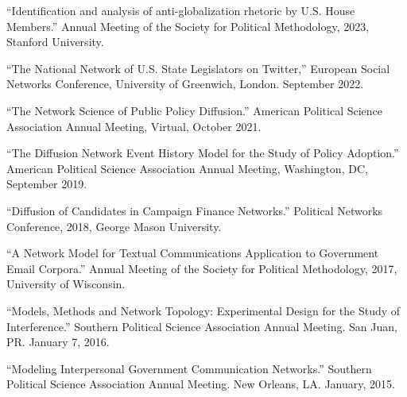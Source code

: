 \documentclass[overlapped,line]{res}
\begin{document}
\begin{resume}
\begin{etaremune}
\item ``Identification and analysis of anti-globalization rhetoric by U.S. House Members.'' Annual Meeting of the Society for Political Methodology, 2023, Stanford University.
\item ``The National Network of U.S. State Legislators on Twitter,'' European Social Networks Conference, University of Greenwich, London. September 2022. 
\item ``The Network Science of Public Policy Diffusion.'' American Political Science Association Annual Meeting, Virtual, October 2021. 
\item ``The Diffusion Network Event History Model for the Study of Policy Adoption.''  American Political Science Association Annual Meeting, Washington, DC, September 2019. 
\item ``Diffusion of Candidates in Campaign Finance Networks.'' Political Networks Conference, 2018, George Mason University.
\item ``A Network Model for Textual Communications Application to Government Email Corpora.'' Annual Meeting of the Society for Political Methodology, 2017, University of Wisconsin.
\item ``Models, Methods and Network Topology: Experimental Design for the Study of Interference.'' Southern Political Science Association Annual Meeting. San Juan, PR. January 7, 2016. 
\item ``Modeling Interpersonal Government Communication Networks.'' Southern Political Science Association Annual Meeting. New Orleans, LA. January, 2015.
\end{etaremune}


\end{resume}
\end{document}
